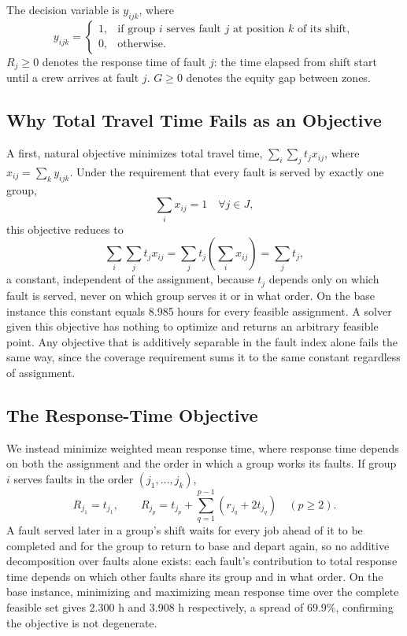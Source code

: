 \documentclass[11pt]{article}
\begin{document}
The decision variable is $y_{ijk}$, where
\[
y_{ijk} =
\begin{cases}
1, & \text{if group } i \text{ serves fault } j \text{ at position } k \text{ of its shift},\\
0, & \text{otherwise.}
\end{cases}
\]
$R_j \geq 0$ denotes the response time of fault $j$: the time elapsed from shift start until a crew arrives at fault $j$. $G \geq 0$ denotes the equity gap between zones.

\subsection*{Why Total Travel Time Fails as an Objective}

A first, natural objective minimizes total travel time, $\sum_i \sum_j t_j x_{ij}$, where $x_{ij} = \sum_k y_{ijk}$. Under the requirement that every fault is served by exactly one group,
\[
\sum_{i} x_{ij} = 1 \quad \forall j \in J,
\]
this objective reduces to
\[
\sum_{i}\sum_{j} t_j x_{ij} = \sum_{j} t_j\left(\sum_i x_{ij}\right) = \sum_{j} t_j,
\]
a constant, independent of the assignment, because $t_j$ depends only on which fault is served, never on which group serves it or in what order. On the base instance this constant equals 8.985 hours for every feasible assignment. A solver given this objective has nothing to optimize and returns an arbitrary feasible point. Any objective that is additively separable in the fault index alone fails the same way, since the coverage requirement sums it to the same constant regardless of assignment.

\subsection*{The Response-Time Objective}

We instead minimize weighted mean response time, where response time depends on both the assignment and the order in which a group works its faults. If group $i$ serves faults in the order $(j_1, \ldots, j_k)$,
\[
R_{j_1} = t_{j_1}, \qquad R_{j_p} = t_{j_p} + \sum_{q=1}^{p-1}\left(r_{j_q} + 2t_{j_q}\right) \quad (p \geq 2).
\]
A fault served later in a group's shift waits for every job ahead of it to be completed and for the group to return to base and depart again, so no additive decomposition over faults alone exists: each fault's contribution to total response time depends on which other faults share its group and in what order. On the base instance, minimizing and maximizing mean response time over the complete feasible set gives 2.300 h and 3.908 h respectively, a spread of 69.9\%, confirming the objective is not degenerate.
\end{document}
